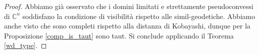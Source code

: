 \begin{proof}
    Abbiamo già osservato che i domini limitati e strettamente pseudoconvessi di $\mathbb{C}^n$ soddisfano la condizione di visibilità rispetto alle simil-geodetiche. Abbiamo anche visto che sono completi rispetto alla distanza di Kobayashi, dunque per la Proposizione \ref{comp_is_taut} sono taut. Si conclude applicando il Teorema \ref{wd_type}.
\end{proof}